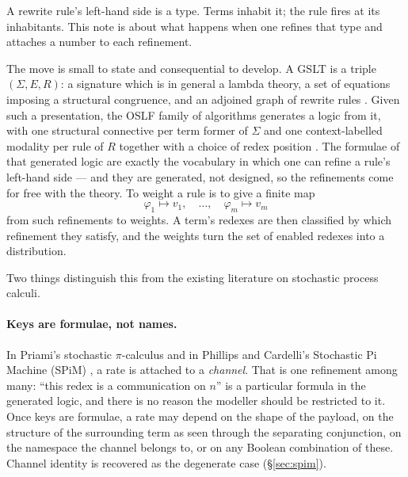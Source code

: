 \documentclass[11pt,a4paper]{article}
\theoremstyle{plain}
\theoremstyle{definition}
\theoremstyle{remark}
\begin{document}
A rewrite rule's left-hand side is a type. Terms inhabit it; the rule fires at its inhabitants. This
note is about what happens when one refines that type and attaches a number to each refinement.

The move is small to state and consequential to develop. A GSLT is a triple $(\Sigma, E, R)$: a
signature which is in general a lambda theory, a set of equations imposing a structural congruence,
and an adjoined graph of rewrite rules \cite{omnibus}. Given such a presentation, the OSLF family of
algorithms generates a logic from it, with one structural connective per term former of $\Sigma$ and
one context-labelled modality per rule of $R$ together with a choice of redex position
\cite{omnibus,classifier}. The formulae of that generated logic are exactly the vocabulary in which
one can refine a rule's left-hand side --- and they are generated, not designed, so the refinements
come for free with the theory. To weight a rule is to give a finite map
\[
\varphi_1 \mapsto v_1, \quad \ldots, \quad \varphi_m \mapsto v_m
\]
from such refinements to weights. A term's redexes are then classified by which refinement they
satisfy, and the weights turn the set of enabled redexes into a distribution.

Two things distinguish this from the existing literature on stochastic process calculi.

\paragraph{Keys are formulae, not names.} In Priami's stochastic $\pi$-calculus \cite{priami} and in
Phillips and Cardelli's Stochastic Pi Machine (SPiM) \cite{spim,spim-sim}, a rate is attached to a
\emph{channel}. That is one refinement among many: ``this redex is a communication on $n$'' is a
particular formula in the generated logic, and there is no reason the modeller should be restricted
to it. Once keys are formulae, a rate may depend on the shape of the payload, on the structure of
the surrounding term as seen through the separating conjunction, on the namespace the channel
belongs to, or on any Boolean combination of these. Channel identity is recovered as the degenerate
case (\S\ref{sec:spim}).
\end{document}

